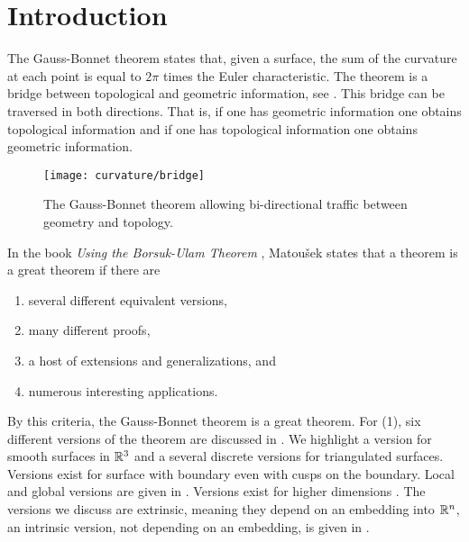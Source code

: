 \section{Introduction}
\label{sec:intro}


The Gauss-Bonnet theorem states that, given a surface, the sum of the curvature
at each point is equal to $2\pi$ times the Euler characteristic.
The theorem is a bridge between topological
and geometric information, see . 
This bridge can be traversed in both directions.
That is, if one has geometric information one obtains topological information and
if one has topological information one obtains geometric information.


\begin{figure}[htb]
\centering
\texttt{[image: curvature/bridge]}
\caption{The Gauss-Bonnet theorem allowing bi-directional traffic
between geometry and topology.}
\label{fig:bridge}
\end{figure}

In the book \emph{Using the Borsuk-Ulam Theorem}
\cite{jm08},
Matou\v{s}ek states that a theorem is a great theorem if there are
\begin{enumerate}[(1)]
\item several different equivalent versions,
\item many different proofs,
\item a host of extensions and generalizations, and
\item numerous interesting applications.
\end{enumerate}

By this criteria, the Gauss-Bonnet theorem is a great theorem.
For (1), six different versions of the theorem are discussed
in \cite{wu_historical_2008}. 
We highlight a version for smooth surfaces in $\mathbb{R}^3$ and
 a several discrete versions for triangulated surfaces. 
 Versions exist for surface with boundary even with cusps on
 the boundary.
 Local and global versions are given in \cite{doc76}.
Versions exist for higher dimensions \cite{guillemin_differential_2010}.
The versions we discuss are extrinsic, meaning they depend on an embedding
into $\mathbb{R}^n$, an intrinsic version, not depending on an embedding,
 is given in \cite{chern_simple_1944}.
 
